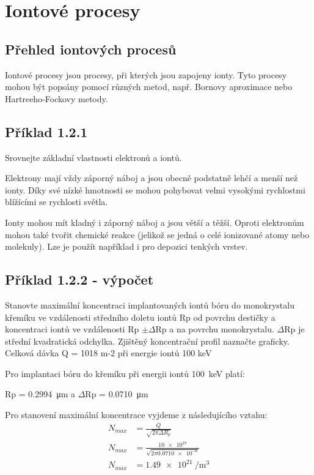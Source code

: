 \section{Iontové procesy}

\subsection{Přehled iontových procesů}

Iontové procesy jsou procesy, při kterých jsou zapojeny ionty. Tyto procesy mohou být popsány pomocí různých metod, např. Bornovy aproximace nebo Hartreeho-Fockovy metody.

\subsection{Příklad 1.2.1}
\begin{zadani}
    Srovnejte základní vlastnosti elektronů a iontů.
\end{zadani}

Elektrony mají vždy záporný náboj a jsou obecně podstatně lehčí a menší než ionty. Díky své nízké hmotnosti se mohou pohybovat velmi vysokými rychlostmi blížícími se rychlosti světla. 

Ionty mohou mít kladný i záporný náboj a jsou větší a těžší. Oproti elektronům mohou také tvořit chemické reakce (jelikož se jedná o celé ionizované atomy nebo molekuly). Lze je použít například i pro depozici tenkých vrstev.


\subsection{Příklad 1.2.2 - výpočet}
\begin{zadani}
    Stanovte maximální koncentraci implantovaných iontů bóru do 
    monokrystalu křemíku ve vzdálenosti středního doletu iontů  Rp od 
    povrchu destičky a koncentraci iontů ve vzdálenosti  Rp \(\pm \Delta\)Rp a na 
    povrchu monokrystalu.  \(\Delta\)Rp  je střední kvadratická odchylka. Zjištěný  
    koncentrační profil naznačte graficky. Celková dávka  Q = 1018 m-2 při  
    energie iontů  100 keV
\end{zadani}


Pro implantaci bóru do křemíku při energii iontů \qty{100}{keV} platí:

Rp = \qty{0,2994}{\micro\meter} a \(\Delta\)Rp = \qty{0,0710}{\micro\meter}

Pro stanovení maximální koncentrace vyjdeme z následujícího vztahu:
\begin{align*}
  N_{max} &= \frac{Q}{\sqrt{2\pi \Delta R_{p} } } \\
  N_{max} &= \frac{\num{10e18}}{\sqrt{2\pi \num{0,0710e-6} } } \\
  N_{max} &= \qty{1,49e21}{\per\meter\cubed}
\end{align*}

